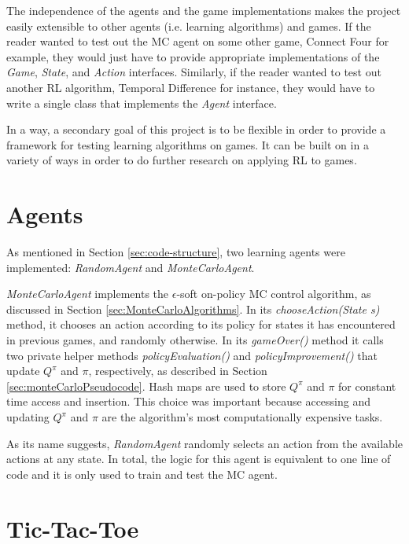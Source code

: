 \documentclass[11pt,a4paper]{report}
\begin{document}
The independence of the agents and the game implementations makes the project easily extensible to other agents (i.e. learning algorithms) and games. If the reader wanted to test out the MC agent on some other game, Connect Four for example, they would just have to provide appropriate implementations of the \emph{Game}, \emph{State}, and \emph{Action} interfaces. Similarly, if the reader wanted to test out another RL algorithm, Temporal Difference for instance, they would have to  write a single class that implements the \emph{Agent} interface.

In a way, a secondary goal of this project is to be flexible in order to provide a framework for testing learning algorithms on games. It can be built on in a variety of ways in order to do further research on applying RL to games.


\section{Agents}
\label{sec:Agents}

As mentioned in Section \ref{sec:code-structure}, two learning agents were implemented: \emph{RandomAgent} and \emph{MonteCarloAgent}.

\emph{MonteCarloAgent} implements the $\epsilon$-soft on-policy MC control algorithm, as discussed in Section \ref{sec:MonteCarloAlgorithms}. In its \emph{chooseAction(State s)} method, it chooses an action according to its policy for states it has encountered in previous games, and randomly otherwise. In its \emph{gameOver()} method it calls two private helper methods \emph{policyEvaluation()} and \emph{policyImprovement()} that update $Q^{\pi}$ and $\pi$, respectively, as described in Section \ref{sec:monteCarloPseudocode}. Hash maps are used to store $Q^{\pi}$ and $\pi$ for constant time access and insertion. This choice was important because accessing and updating $Q^{\pi}$ and $\pi$ are the algorithm's most computationally expensive tasks.

As its name suggests, \emph{RandomAgent} randomly selects an action from the available actions at any state. In total, the logic for this agent is equivalent to one line of code and it is only used to train and test the MC agent.


\newpage

\section{Tic-Tac-Toe}
\label{sec:TicTacToe}
\end{document}
